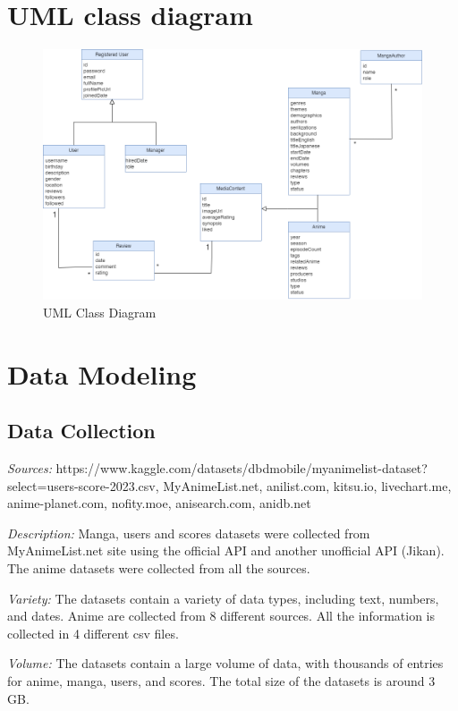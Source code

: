 \section{UML class diagram}
\begin{figure}[h]
    \centering
    \includegraphics[width=\linewidth]{Media/Class Diagram.png}
    \caption{UML Class Diagram}
    \label{uml class diagram}
\end{figure}

\newpage


\section{Data Modeling}
\subsection{Data Collection}
\textit{Sources:} https://www.kaggle.com/datasets/dbdmobile/myanimelist-dataset?select=users-score-2023.csv, MyAnimeList.net,	anilist.com,  kitsu.io,			  livechart.me,
anime-planet.com,		nofity.moe,	   anisearch.com,		  anidb.net 	

\textit{Description:} Manga, users and scores datasets were collected from MyAnimeList.net site using the official API and another unofficial API (Jikan). The anime datasets were collected from all the sources. 

\textit{Variety:} The datasets contain a variety of data types, including text, numbers, and dates. Anime are collected from 8 different sources. All the information is collected in 4 different csv files.

\textit{Volume:} The datasets contain a large volume of data, with thousands of entries for anime, manga, users, and scores. The total size of the datasets is around 3 GB.

